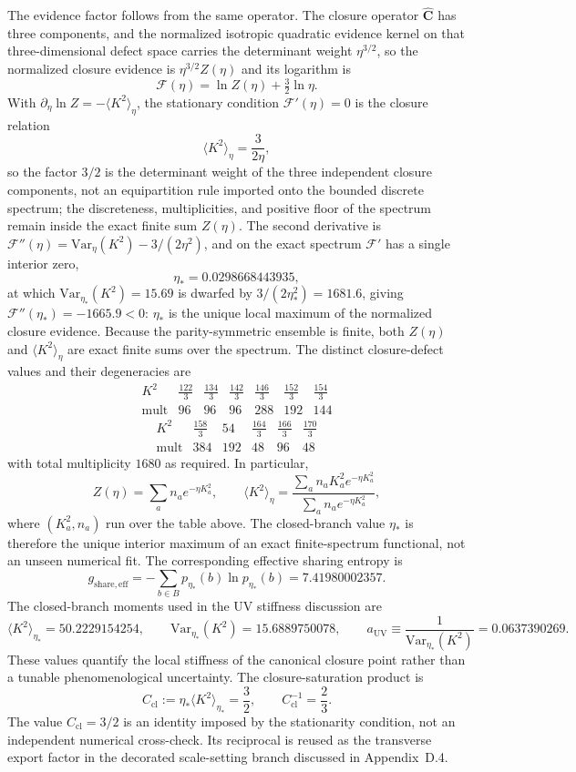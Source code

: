 \documentclass[11pt]{article}
\begin{document}
The evidence factor follows from the same operator. The closure operator $\widehat{\mathbf C}$ has three components, and the normalized isotropic quadratic evidence kernel on that three-dimensional defect space carries the determinant weight $\eta^{3/2}$, so the normalized closure evidence is $\eta^{3/2}Z(\eta)$ and its logarithm is
\[
\mathcal F(\eta)=\ln Z(\eta)+\tfrac32\ln\eta.
\]
With $\partial_\eta\ln Z=-\langle K^2\rangle_\eta$, the stationary condition $\mathcal F'(\eta)=0$ is the closure relation
\[
\langle K^2\rangle_\eta=\frac{3}{2\eta},
\]
so the factor $3/2$ is the determinant weight of the three independent closure components, not an equipartition rule imported onto the bounded discrete spectrum; the discreteness, multiplicities, and positive floor of the spectrum remain inside the exact finite sum $Z(\eta)$. The second derivative is $\mathcal F''(\eta)=\mathrm{Var}_\eta(K^2)-3/(2\eta^2)$, and on the exact spectrum $\mathcal F'$ has a single interior zero,
\[
\eta_*=0.0298668443935,
\]
at which $\mathrm{Var}_{\eta_*}(K^2)=15.69$ is dwarfed by $3/(2\eta_*^2)=1681.6$, giving $\mathcal F''(\eta_*)=-1665.9<0$: $\eta_*$ is the unique local maximum of the normalized closure evidence.
Because the parity-symmetric ensemble is finite, both $Z(\eta)$ and $\langle K^2\rangle_\eta$ are exact finite sums over the spectrum. The distinct closure-defect values and their degeneracies are
\[
\begin{array}{c|cccccc}
K^2 &
\frac{122}{3} & \frac{134}{3} & \frac{142}{3} & \frac{146}{3} & \frac{152}{3} & \frac{154}{3} \\ \hline
\mathrm{mult} &
96 & 96 & 96 & 288 & 192 & 144
\end{array}
\]
\[
\begin{array}{c|ccccc}
K^2 &
\frac{158}{3} & 54 & \frac{164}{3} & \frac{166}{3} & \frac{170}{3} \\ \hline
\mathrm{mult} &
384 & 192 & 48 & 96 & 48
\end{array}
\]
with total multiplicity $1680$ as required. In particular,
\[
Z(\eta)=\sum_a n_a e^{-\eta K_a^2},
\qquad
\langle K^2\rangle_\eta=\frac{\sum_a n_a K_a^2 e^{-\eta K_a^2}}{\sum_a n_a e^{-\eta K_a^2}},
\]
where $(K_a^2,n_a)$ run over the table above. The closed-branch value $\eta_*$ is therefore the unique interior maximum of an exact finite-spectrum functional, not an unseen numerical fit.
The corresponding effective sharing entropy is
\[
g_{\mathrm{share,eff}}
=
-\sum_{b\in B}p_{\eta_*}(b)\ln p_{\eta_*}(b)
=
7.41980002357.
\]
The closed-branch moments used in the UV stiffness discussion are
\[
\langle K^2\rangle_{\eta_*}=50.2229154254,
\qquad
\mathrm{Var}_{\eta_*}(K^2)=15.6889750078,
\qquad
a_{\mathrm{UV}}\equiv\frac{1}{\mathrm{Var}_{\eta_*}(K^2)}=0.0637390269.
\]
These values quantify the local stiffness of the canonical closure point rather than a tunable phenomenological uncertainty.
The closure-saturation product is
\[
C_{\mathrm{cl}}:=\eta_*\langle K^2\rangle_{\eta_*}=\frac32,
\qquad
C_{\mathrm{cl}}^{-1}=\frac23.
\]
The value $C_{\mathrm{cl}}=3/2$ is an identity imposed by the stationarity condition, not an independent numerical cross-check. Its reciprocal is reused as the transverse export factor in the decorated scale-setting branch discussed in Appendix~D.4.
\end{document}
